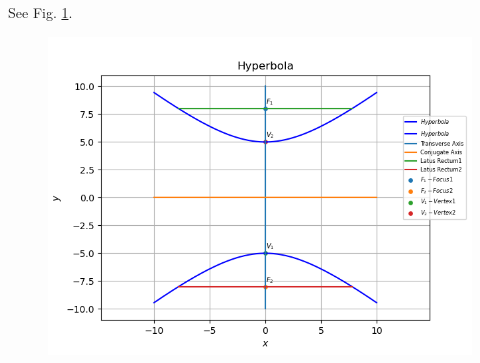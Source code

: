 See Fig. \ref{fig:chapters/11/11/4/8/Fig1}.
\begin{figure}[!h]
	\begin{center} 
	    \includegraphics[width=\columnwidth]{chapters/11/11/4/8/figs/hyperbola2}
	\end{center}
\caption{}
\label{fig:chapters/11/11/4/8/Fig1}
\end{figure}

